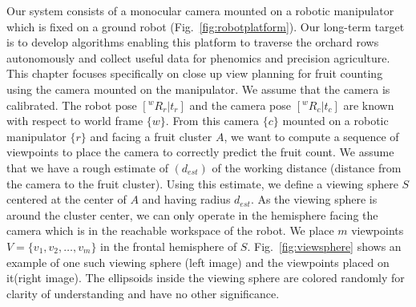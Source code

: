 Our system consists of a monocular camera mounted on a robotic manipulator which is fixed on a ground robot (Fig.~\ref{fig:robotplatform}). Our long-term target is to develop algorithms enabling this platform to traverse the orchard rows autonomously and collect useful data for phenomics and precision agriculture. This chapter focuses specifically on close up view planning for fruit counting using the camera mounted on the manipulator. We assume that the camera is calibrated. The robot pose $[^w R_r|t_r]$ and the camera pose $[^w R_c|t_c]$ are known with respect to world frame $\{w\}$. From this camera $\{c\}$ mounted on a robotic manipulator $\{r\}$ and facing a fruit cluster $A$, we want to compute a sequence of viewpoints to place the camera to correctly predict the fruit count. We assume that we have a rough estimate of $\left(d_{est}\right)$ of the working distance (distance from the camera to the fruit cluster). Using this estimate, we define a viewing sphere $S$ centered at the center of $A$ and having radius $d_{est}$. As the viewing sphere is around the cluster center, we can only operate in the hemisphere facing the camera which is in the reachable workspace of the robot. We place $m$ viewpoints $V = \{v_1,v_2, \ldots, v_m\}$ in the frontal hemisphere of $S$. Fig.~\ref{fig:viewsphere} shows an example of one such viewing sphere (left image) and the viewpoints placed on it(right image). The ellipsoids inside the viewing sphere are colored randomly for clarity of understanding and have no other significance.

